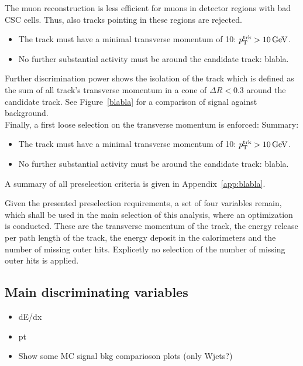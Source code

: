 The muon reconstruction is less efficient for muons in detector regions with bad CSC cells.
Thus, also tracks pointing in these regions are rejected.


\begin{itemize}
\renewcommand{\labelitemi}{\footnotesize{\ding{118}}}
\item The track must have a minimal transverse momentum of 10\gev: \mbox{$p_{\text{T}}^{\text{trk}}>10\,\text{Ge}\kern-0.06667em\text{V}$.}
\item No further substantial activity must be around the candidate track: \mbox{blabla.}
\end{itemize}

Further discrimination power shows the isolation of the track which is defined as the sum of all track's transverse momentum in a cone of $\Delta R < 0.3$ around the candidate track.
See Figure~\ref{blabla} for a comparison of signal against background.\\

Finally, a first loose selection on the transverse momentum is enforced:
Summary:
\begin{itemize}
\renewcommand{\labelitemi}{\footnotesize{\ding{118}}}
\item The track must have a minimal transverse momentum of 10\gev: \mbox{$p_{\text{T}}^{\text{trk}}>10\,\text{Ge}\kern-0.06667em\text{V}$.}
\item No further substantial activity must be around the candidate track: \mbox{blabla.}
\end{itemize}

A summary of all preselection criteria is given in Appendix~\ref{app:blabla}.

Given the presented preselection requirements, a set of four variables remain, which shall be used in the main selection of this analysis, where an optimization is conducted.
These are the transverse momentum of the track, the energy release per path length of the track, the energy deposit in the calorimeters and the number of missing outer hits.
Explicetly no selection of the number of missing outer hits is applied.



\newpage

\subsection{Main discriminating variables}
\begin{itemize}
\item dE/dx
\item pt
\item Show some MC signal bkg comparioson plots (only Wjets?)
\end{itemize}
